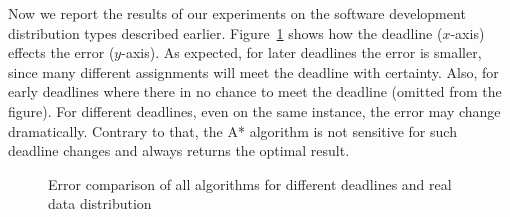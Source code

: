\documentclass[letterpaper]{article} %
\newcommand{\astar}{\textsc{A*}\xspace}
\newcommand{\sampling}{\textsc{Sampling}\xspace}
\newcommand{\expectation}{\textsc{Expectation}\xspace}
\newcommand\Roni[1]{\nb{\textbf{Roni:}}{blue}{#1}}
\begin{document}
Now we report the results of our experiments on the software development distribution types described earlier.
Figure~\ref{allDDRealError} shows how the deadline ($x$-axis) effects the error ($y$-axis).
As expected, for later deadlines the error is smaller, since many different assignments will meet the deadline with certainty. Also, for early deadlines where there in no chance to meet the deadline (omitted from the figure). For different deadlines, even on the same instance, the error may change dramatically. Contrary to that, the \astar algorithm is not sensitive for such deadline changes and always returns the optimal result.


\begin{figure}[h!]
	\scriptsize
	\caption{Error comparison of all algorithms for different deadlines and real data distribution}\label{allDDRealError}
\end{figure}
\end{document}

